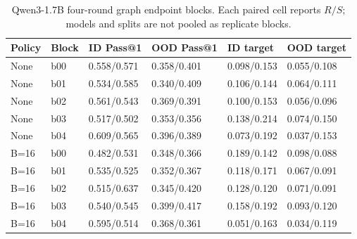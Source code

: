 \begin{table}[H]
\caption{Qwen3-1.7B four-round graph endpoint blocks. Each paired cell reports $R/S$; models and splits are not pooled as replicate blocks.}
\label{tab:qwen-blocks}
\centering\small\setlength{\tabcolsep}{3pt}
\begin{tabular}{@{}llllll@{}}
\toprule
Policy & Block & ID Pass@1 & OOD Pass@1 & ID target & OOD target\\
\midrule
None & b00 & 0.558/0.571 & 0.358/0.401 & 0.098/0.153 & 0.055/0.108\\
None & b01 & 0.534/0.585 & 0.340/0.409 & 0.106/0.144 & 0.064/0.111\\
None & b02 & 0.561/0.543 & 0.369/0.391 & 0.100/0.153 & 0.056/0.096\\
None & b03 & 0.517/0.502 & 0.353/0.356 & 0.138/0.214 & 0.074/0.150\\
None & b04 & 0.609/0.565 & 0.396/0.389 & 0.073/0.192 & 0.037/0.153\\
B=16 & b00 & 0.482/0.531 & 0.348/0.366 & 0.189/0.142 & 0.098/0.088\\
B=16 & b01 & 0.535/0.525 & 0.352/0.367 & 0.118/0.171 & 0.067/0.091\\
B=16 & b02 & 0.515/0.637 & 0.345/0.420 & 0.128/0.120 & 0.071/0.091\\
B=16 & b03 & 0.540/0.545 & 0.399/0.417 & 0.158/0.192 & 0.093/0.120\\
B=16 & b04 & 0.595/0.514 & 0.368/0.361 & 0.051/0.163 & 0.034/0.119\\
\bottomrule
\end{tabular}
\end{table}
